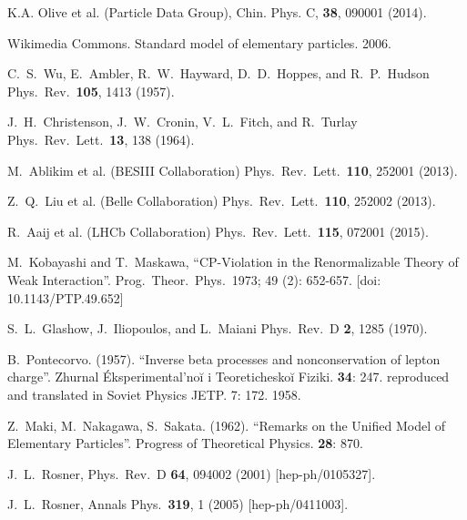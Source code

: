 \begin{thebibliography}{99}



  K.A. Olive et al. (Particle Data Group),
  Chin. Phys. C, {\bf 38}, 090001 (2014).

  Wikimedia Commons.
  Standard model of elementary particles. 2006.

  C.~S.~Wu, E.~Ambler, R.~W.~Hayward, D.~D.~Hoppes, and R.~P.~Hudson
  Phys.\ Rev.\ {\bf 105}, 1413 (1957).

  J.~H.~Christenson, J.~W.~Cronin, V.~L.~Fitch, and R.~Turlay
  Phys.\ Rev.\ Lett.\ {\bf 13}, 138 (1964).

  M.~Ablikim et al. (BESIII Collaboration)
  Phys.\ Rev.\ Lett.\ {\bf 110}, 252001 (2013).

  Z.~Q.~Liu et al. (Belle Collaboration)
  Phys.\ Rev.\ Lett.\ {\bf 110}, 252002 (2013).

  R.~Aaij et al. (LHCb Collaboration)
  Phys.\ Rev.\ Lett.\ {\bf 115}, 072001 (2015).

  M.~Kobayashi and T.~Maskawa,
  ``CP-Violation in the Renormalizable Theory of Weak Interaction''.
  Prog.\ Theor.\ Phys.\ 1973; 49 (2): 652-657. 
  [doi: 10.1143/PTP.49.652]

  S.~L.~Glashow, J.~Iliopoulos, and L.~Maiani
  Phys.\ Rev.\ D {\bf 2}, 1285 (1970).

  B.~Pontecorvo. (1957).
  ``Inverse beta processes and nonconservation of lepton charge''.
  Zhurnal Éksperimental’noĭ i Teoreticheskoĭ Fiziki.  {\bf 34}: 247.
  reproduced and translated in Soviet Physics JETP. 7: 172. 1958.

  Z.~Maki, M.~Nakagawa, S.~Sakata. (1962).
  ``Remarks on the Unified Model of Elementary Particles''.
  Progress of Theoretical Physics. {\bf 28}: 870.

  J.~L.~Rosner,
  Phys.\ Rev.\ D {\bf 64}, 094002 (2001)
  [hep-ph/0105327].

  J.~L.~Rosner,
  Annals Phys.\  {\bf 319}, 1 (2005)
  [hep-ph/0411003].


\end{thebibliography}
